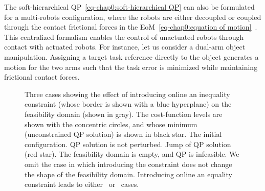 The soft-hierarchical QP~\cref{eq-chap0:soft-hierarchical QP} can also be formulated for a multi-robots configuration, where the robots are either decoupled or coupled through the contact frictional forces in the EoM~\cref{eq-chap0:equation of motion}~\cite{bouyarmane2019tro}. This centralized formalism enables the control of unactuated robots through contact with actuated robots. For instance, let us consider a dual-arm object manipulation.  Assigning a target task reference directly to the object generates a motion for the two arms such that the task error is minimized while maintaining frictional contact forces.   
\begin{figure}
	\centering			
	\caption{Three cases showing the effect of introducing online an inequality constraint (whose border is shown with a blue hyperplane) on the feasibility domain (shown in gray). The cost-function levels are shown with the concentric circles, and whose minimum (unconstrained QP solution) is shown in black star.  The initial configuration.  QP solution is not perturbed.  Jump of QP solution (red star).  The feasibility domain is empty, and QP is infeasible. 	We omit the case in which introducing the constraint does not change the shape of the feasibility domain. Introducing online an equality constraint leads to either~ or~ cases.}
	\label{fig:configs}
\end{figure}


